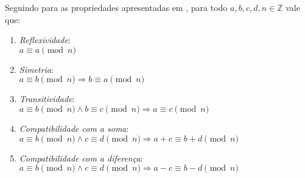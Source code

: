     Seguindo para as propriedades apresentadas em \cite{book:2399854}, para todo $a,b, c, d, n \in \mathbb{Z}$ vale que:
\begin{enumerate}
    \item \textit{Reflexividade}: 
    \\
    $a \equiv a \pmod{n}$
    
    \item \textit{Simetria}: 
    \\ 
    $a \equiv b \pmod{n} \Longrightarrow b \equiv a \pmod{n}$
    
    \item \textit{Transitividade}: 
    \\
    $a \equiv b \pmod{n} \land b \equiv c \pmod{n} \Longrightarrow a \equiv c \pmod{n}$
    
    \item \textit{Compatibilidade com a soma}: 
    \\
    $a \equiv b \pmod{n} \land c \equiv d \pmod{n} \Longrightarrow a + c \equiv b + d \pmod{n}$

    \item \textit{Compatibilidade com a diferença}: 
    \\
    $a \equiv b \pmod{n} \land c \equiv d \pmod{n} \Longrightarrow a - c \equiv b - d \pmod{n}$


\end{enumerate}

